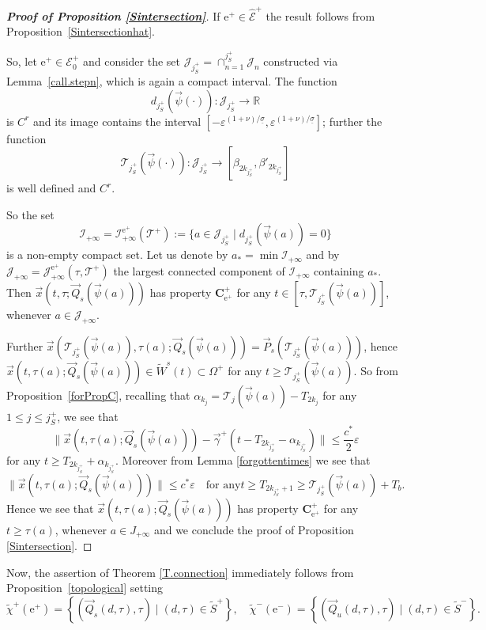 \documentclass[10pt]{article}
\numberwithin{equation}{section}
\def\ga{\vec{\gamma}}
\def\ep{\varepsilon}
\def\si{\sigma}
\def\Om{\Omega}
\def\R{{\mathbb R}}
\def\ee{{\mathrm e}}
\def\EE{{\mathcal E}}
\def\TT{{\mathcal T}}
\def\TTT{\mathscr{T}}
\def\Q{\vec{Q}}
\def\P{\vec{P}}
\def\x{\vec{x}}
\newcommand\bs[1]{{\boldsymbol{#1}}}
\def\und{\underline}
\theoremstyle{definition}
\theoremstyle{remark}
\begin{document}
\begin{proof}[\textbf{Proof of Proposition \ref{Sintersection}}]

If $\ee^+ \in \hat{\EE}^+$ the result follows from Proposition~\ref{Sintersectionhat}.

So, let  $\ee^+ \in \EE^+_0$ and consider the set
$\mathcal{J}_{j^+_S}= \cap_{n=1}^{j^+_S} \mathcal{J}_{n}$ constructed via Lemma~\ref{call.stepn}, which is again a compact interval.
The function
$$ d_{j^+_S}(\vec{\psi}(\cdot)): \mathcal{J}_{j^+_S} \to \R$$
is $C^r$ and its image contains the interval $[-\ep^{(1+\nu)/\und{\si}} , \ep^{(1+\nu)/\und{\si}}]$;
further the function
$$ \TTT_{j^+_S} (\vec{\psi}(\cdot)): \mathcal{J}_{j^+_S}  \to [\beta_{2k_{j^+_S}}, \beta'_{2k_{j^+_S}}] $$
is well defined and $C^r$.

 So   the set
$$\mathcal{I}_{+\infty}= \mathcal{I}_{+\infty}^{\ee^+}(\TT^+):= \{a \in \mathcal{J}_{j^+_S}    \mid d_{j^+_S} (\vec{\psi}(a))=0 \}$$
is a non-empty compact set. Let us denote by $a_*= \min \mathcal{I}_{+\infty}$ and by
$\mathcal{J}_{+\infty}=\mathcal{J}_{+\infty}^{\ee^+}(\tau, \TT^+)$ the largest connected
component
of $\mathcal{I}_{+\infty}$ containing $a_*$.
Then $\x(t,\tau; \Q_s(\vec{\psi}(a)))$ has property $\bs{C^+_{\ee^+}}$   for any $t \in [\tau,
\TTT_{j^+_S}(\vec{\psi}(a))]$, whenever  $a \in
\mathcal{J}_{+\infty}$.


Further  $\x(\TTT_{j^+_S}(\vec{\psi}(a)),\tau(a); \Q_s(\vec{\psi}(a)))= \P_s(\TTT_{j^+_S}(\vec{\psi}(a)))$, hence \\
\mbox{$\x(t,\tau(a); \Q_s(\vec{\psi}(a))) \in \tilde{W}^s(t) \subset \Om^+$} for any $t \ge \TTT_{j^+_S}(\vec{\psi}(a))$.
So from Proposition~\ref{forPropC}, recalling that
$\alpha_{k_j}= \TTT_{j}(\vec{\psi}(a))-T_{2k_j}$ for any $1 \le j \le j^+_S$,
 we see that
$$ \|\x(t,\tau(a); \Q_s(\vec{\psi}(a)))- \ga^+(t- T_{2k_{j^+_S}}-\alpha_{k_{j^+_S}})\| \le \frac{c^*}{2} \ep$$
for any $t \ge T_{ 2k_{j^+_S}}+\alpha_{k_{j^+_S}}$.
Moreover from Lemma \ref{forgottentimes} we see that
$$\|\x(t,\tau(a); \Q_s(\vec{\psi}(a)))\| \le c^* \ep \quad  \textrm{for any
$t \ge T_{ 2k_{j^+_S}+1} \ge  \TTT_{j^+_S}(\vec{\psi}(a)) + T_b$.}$$
Hence we see that $ \x(t,\tau(a); \Q_s(\vec{\psi}(a)))$ has property $\bs{C^+_{\ee^+}}$ for any $t \ge \tau(a)$, whenever
 $a\in J_{+\infty}$  and we conclude the proof of Proposition \ref{Sintersection}.
\end{proof}

\medskip


Now, the assertion of Theorem \ref{T.connection} immediately follows from Proposition~\ref{topological} setting
$$\tilde{\chi}^+(\ee^+)=  \left\{ (\Q_s(d,\tau),\tau)   \mid  (d,\tau) \in \tilde{S}^+   \right\},   \quad
\tilde{\chi}^-(\ee^-)=  \left\{ (\Q_u(d,\tau),\tau)   \mid  (d,\tau) \in \tilde{S}^-   \right\}.
$$
\end{document}
